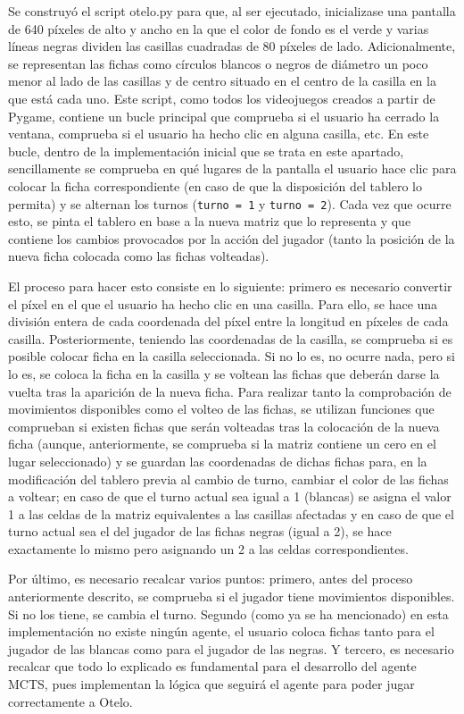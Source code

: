 \documentclass[conference]{IEEEtran}
\begin{document}
Se construyó el script otelo.py para que, al ser ejecutado, inicializase una pantalla de 640 píxeles de alto y ancho en la que el color de fondo es el verde y varias líneas negras dividen las casillas cuadradas de 80 píxeles de lado. Adicionalmente, se representan las fichas como círculos blancos o negros de diámetro un poco menor al lado de las casillas y de centro situado en el centro de la casilla en la que está cada uno. Este script, como todos los videojuegos creados a partir de Pygame, contiene un bucle principal que comprueba si el usuario ha cerrado la ventana, comprueba si el usuario ha hecho clic en alguna casilla, etc. En este bucle, dentro de la implementación inicial que se trata en este apartado, sencillamente se comprueba en qué lugares de la pantalla el usuario hace clic para colocar la ficha correspondiente (en caso de que la disposición del tablero lo permita) y se alternan los turnos (\texttt{turno = 1} y \texttt{turno = 2}). Cada vez que ocurre esto, se pinta el tablero en base a la nueva matriz que lo representa y que contiene los cambios provocados por la acción del jugador (tanto la posición de la nueva ficha colocada como las fichas volteadas).

El proceso para hacer esto consiste en lo siguiente: primero es necesario convertir el píxel en el que el usuario ha hecho clic en una casilla. Para ello, se hace una división entera de cada coordenada del píxel entre la longitud en píxeles de cada casilla. Posteriormente, teniendo las coordenadas de la casilla, se comprueba si es posible colocar ficha en la casilla seleccionada. Si no lo es, no ocurre nada, pero si lo es, se coloca la ficha en la casilla y se voltean las fichas que deberán darse la vuelta tras la aparición de la nueva ficha. Para realizar tanto la comprobación de movimientos disponibles como el volteo de las fichas, se utilizan funciones que comprueban si existen fichas que serán volteadas tras la colocación de la nueva ficha (aunque, anteriormente, se comprueba si la matriz contiene un cero en el lugar seleccionado) y se guardan las coordenadas de dichas fichas para, en la modificación del tablero previa al cambio de turno, cambiar el color de las fichas a voltear; en caso de que el turno actual sea igual a 1 (blancas) se asigna el valor 1 a las celdas de la matriz equivalentes a las casillas afectadas y en caso de que el turno actual sea el del jugador de las fichas negras (igual a 2), se hace exactamente lo mismo pero asignando un 2 a las celdas correspondientes.

Por último, es necesario recalcar varios puntos: primero, antes del proceso anteriormente descrito, se comprueba si el jugador tiene movimientos disponibles. Si no los tiene, se cambia el turno. Segundo (como ya se ha mencionado) en esta implementación no existe ningún agente, el usuario coloca fichas tanto para el jugador de las blancas como para el jugador de las negras. Y tercero, es necesario recalcar que todo lo explicado es fundamental para el desarrollo del agente MCTS, pues implementan la lógica que seguirá el agente para poder jugar correctamente a Otelo.
\end{document}

